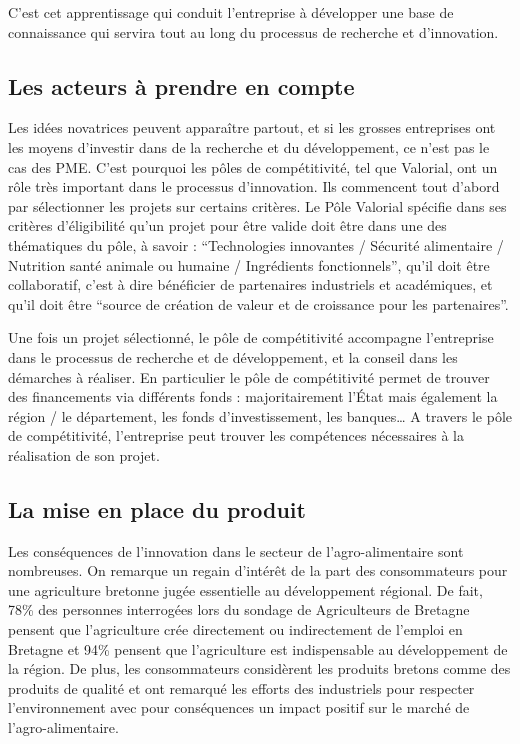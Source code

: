 \documentclass[a4paper,12pt]{report}
\begin{document}
			C’est cet apprentissage qui conduit l’entreprise à développer une base de connaissance qui servira tout au long du processus de recherche et d’innovation.
			
		\subsection{Les acteurs à prendre en compte}
			Les idées novatrices peuvent apparaître partout, et si les grosses entreprises ont les moyens d’investir dans de la recherche et du développement, ce n’est pas le cas des PME. C’est pourquoi les pôles de compétitivité, tel que Valorial, ont un rôle très important dans le processus d’innovation. Ils commencent tout d’abord par sélectionner les projets sur certains critères. Le Pôle Valorial spécifie dans ses critères d’éligibilité\cite{Eligibilite} qu’un projet pour être valide doit être dans une des thématiques du pôle, à savoir : “Technologies innovantes / Sécurité alimentaire / Nutrition santé animale ou humaine / Ingrédients fonctionnels”, qu’il doit être collaboratif, c’est à dire bénéficier de partenaires industriels et académiques, et qu’il doit être “source de création de valeur et de croissance pour les partenaires”.
			
			Une fois un projet sélectionné, le pôle de compétitivité accompagne l’entreprise dans le processus de recherche et de développement, et la conseil dans les démarches à réaliser. En particulier le pôle de compétitivité permet de trouver des financements via différents fonds : majoritairement l’État mais également la région / le département, les fonds d’investissement, les banques…
			A travers le pôle de compétitivité, l’entreprise peut trouver les compétences nécessaires à la réalisation de son projet.
				
		\subsection{La mise en place du produit}
		Les conséquences de l’innovation dans le secteur de l’agro-alimentaire sont nombreuses. On remarque un regain d’intérêt de la part des consommateurs pour une agriculture bretonne jugée essentielle au développement régional. De fait, 78\% des personnes interrogées lors du sondage de Agriculteurs de Bretagne pensent que l’agriculture crée directement ou indirectement de l’emploi en Bretagne et 94\% pensent que l’agriculture est indispensable au développement de la région\cite{AgriculteursDeBretagne}. De plus, les consommateurs considèrent les produits bretons comme des produits de qualité et ont remarqué les efforts des industriels pour respecter l’environnement avec pour conséquences un impact positif sur le marché de l’agro-alimentaire.
\end{document}
